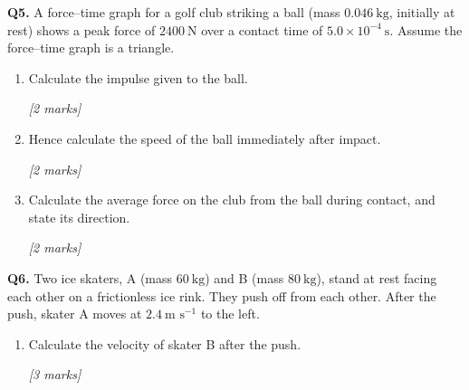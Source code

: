 \begin{tcolorbox}[colback=white, colframe=midblue, breakable]

\begin{minipage}{\linewidth}
\textbf{Q5.} A force--time graph for a golf club striking a ball (mass $0.046\ \text{kg}$, initially at rest) shows a peak force of $2400\ \text{N}$ over a contact time of $5.0\times10^{-4}\ \text{s}$. Assume the force--time graph is a triangle.
\end{minipage}

\begin{enumerate}[label=(\alph*)]
  \item \begin{minipage}[t]{\linewidth}
  Calculate the impulse given to the ball.
  \par\hfill\textit{[2 marks]}
  \vspace{3cm}
  \end{minipage}

  \item \begin{minipage}[t]{\linewidth}
  Hence calculate the speed of the ball immediately after impact.
  \par\hfill\textit{[2 marks]}
  \vspace{2.5cm}
  \end{minipage}

  \item \begin{minipage}[t]{\linewidth}
  Calculate the average force on the club from the ball during contact, and state its direction.
  \par\hfill\textit{[2 marks]}
  \vspace{3cm}
  \end{minipage}
\end{enumerate}

\begin{minipage}{\linewidth}
\textbf{Q6.} Two ice skaters, A (mass $60\ \text{kg}$) and B (mass $80\ \text{kg}$), stand at rest facing each other on a frictionless ice rink. They push off from each other. After the push, skater A moves at $2.4\ \text{m s}^{-1}$ to the left.
\end{minipage}

\begin{enumerate}[label=(\alph*)]
  \item \begin{minipage}[t]{\linewidth}
  Calculate the velocity of skater B after the push.
  \par\hfill\textit{[3 marks]}
  \vspace{3.5cm}
  \end{minipage}


\end{enumerate}
\end{tcolorbox}
